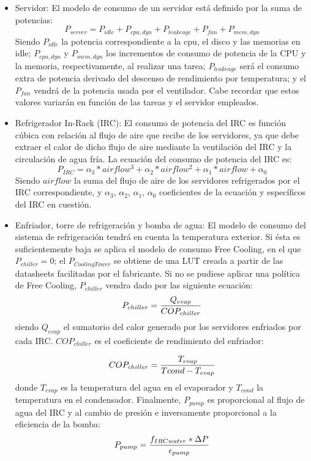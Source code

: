 \begin{itemize}
\item Servidor: El modelo de consumo de un servidor está definido por la suma de potencias:
\begin{equation}
P_{server}=P_{idle} + P_{cpu,dyn} + P_{leakeage} +P_{fan} + P_{mem,dyn}
\end{equation}
Siendo $P_{idle}$ la potencia correspondiente a la cpu, el disco y las memorias en idle; $P_{cpu,dyn}$ y $P_{mem,dyn}$ los incrementos de  consumo de potencia de la CPU y la memoria, respectivamente, al realizar una tarea; $P_{leakeage}$ será el consumo extra de potencia derivado del descenso de rendimiento por temperatura; y el $P_{fan}$ vendrá de la potencia usada por el ventilador. Cabe recordar que estos valores variarán en función de las tareas y el servidor empleados.
\item Refrigerador In-Rack (IRC): El consumo de potencia del IRC es función cúbica con relación al flujo de aire que recibe de los servidores, ya que debe extraer el calor de  dicho flujo de aire mediante la ventilación del IRC y la circulación de agua fría. La ecuación del consumo de potencia del IRC es:
\begin{equation}
P_{IRC}=\alpha_{3}*airflow^{3}+\alpha_{2}*airflow^{2}+\alpha_{1}*airflow+\alpha_{0}
\end{equation}
Siendo $airflow$ la suma del flujo de aire de los servidores refrigerados por el IRC correspondiente, y  $\alpha_{3}$, $\alpha_{2}$, $\alpha_{1}$, $\alpha_{0}$ coeficientes de la ecuación y específicos del IRC en cuestión.
\item Enfriador, torre de refrigeración y bomba de agua: El modelo de consumo del sistema de refrigeración tendrá en cuenta la temperatura exterior. Si ésta es suficientemente baja se aplica el modelo de consumo Free Cooling, en el que $P_{chiller}=0$;  el $P_{CoolingTower}$ se obtiene de una LUT creada a partir de las datasheets facilitadas por el fabricante. Si no se pudiese aplicar una política de Free Cooling, $P_{chiller}$ vendra dado por las siguiente ecuación:
\begin{equation}
P_{chiller}={Q_{evap} \over COP_{chiller}}
\end{equation}
siendo $Q_{evap}$ el sumatorio del calor generado por los servidores enfriados por cada IRC. $COP_{chiller}$ es el coeficiente de  rendimiento del enfriador:

\begin{equation}
COP_{chiller}={T_{evap} \over T{cond}-T_{evap}}
\end{equation}
donde $T_{evap}$ es la temperatura del agua en el evaporador y $T_{cond}$ la temperatura en el condensador.
Finalmente, $P_{pump}$ es proporcional al flujo de agua del IRC y al cambio de presión  e inversamente proporcional a la eficiencia de la bomba:
\begin{equation}
P_{pump}={f_{IRCwater}*\Delta P \over \epsilon_{pump}}
\end{equation}

\end{itemize}

